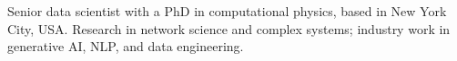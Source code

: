 Senior data scientist with a PhD in computational physics, based in New York City, USA.
Research in network science and complex systems; industry work in generative AI,
 NLP, and data engineering.
